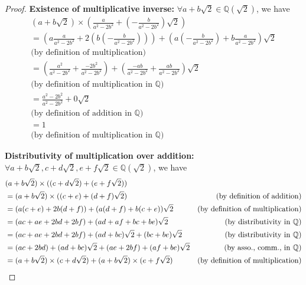 \documentclass[10pt]{article}
\newcommand{\Q}{\mathbb{Q}}
\newenvironment{problem}[2][Problem]{\begin{trivlist}
\item[\hskip \labelsep {\bfseries #1}\hskip \labelsep {\bfseries #2.}]}{\end{trivlist}}
\begin{document}
\begin{problem}{4}
\begin{enumerate}
\begin{proof}
                \textbf{Existence of multiplicative inverse:} \( \forall a + b\sqrt{2} \in \Q(\sqrt{2}) \), we have
                \begin{align*}
                    &(a + b\sqrt{2}) \times \left(\frac{a}{a^2 - 2b^2} + \left(- \frac{b}{a^2 - 2b^2}\right)\sqrt{2}\right) & \\
                    &= \left(a \frac{a}{a^2 - 2b^2} + 2\left(b \left(-\frac{b}{a^2 - 2b^2}\right)\right)\right) + \left(a \left(-\frac{b}{a^2 - 2b^2}\right) + b \frac{a}{a^2 - 2b^2}\right)\sqrt{2} \\
                    & \text{(by definition of multiplication)} & \\
                    &= \left(\frac{a^2}{a^2 - 2b^2} + \frac{-2b^2}{a^2 - 2b^2}\right) + \left(\frac{-ab}{a^2 - 2b^2} + \frac{ab}{a^2 - 2b^2}\right)\sqrt{2} & \\ 
                    & \text{(by definition of multiplication in $\Q$)} & \\
                    &= \frac{a^2 - 2b^2}{a^2 - 2b^2} + 0\sqrt{2} \\
                    & \text{(by definition of addition in $\Q$)} & \\
                    &= 1 \\
                    & \text{(by definition of multiplication in $\Q$)} &
                \end{align*}


                \textbf{Distributivity of multiplication over addition:} \( \forall a + b\sqrt{2}, c + d\sqrt{2}, e + f\sqrt{2} \in \Q(\sqrt{2}) \), we have
                \begin{align*}
                    & (a + b\sqrt{2}) \times ((c + d\sqrt{2}) + (e + f\sqrt{2})) \\
                    &= (a + b\sqrt{2}) \times ((c + e) + (d + f)\sqrt{2}) & \text{(by definition of addition)} \hfill \\
                                                                             &= (a(c + e) + 2b(d + f)) + (a(d + f) + b(c + e))\sqrt{2} & \text{(by definition of multiplication)} \hfill \\
                                                                             &= (ac + ae + 2bd + 2bf) + (ad + af + bc + be)\sqrt{2} & \text{(by distributivity in $\Q$)} \hfill \\
                                                                             &= (ac + ae + 2bd + 2bf) + (ad +bc)\sqrt{2} + (bc + be)\sqrt{2} & \text{(by distributivity in $\Q$)} \hfill \\
                                                                             &= (ac + 2bd) + (ad + bc)\sqrt{2} + (ae + 2bf) + (af + be)\sqrt{2} & \text{(by asso., comm., in $\Q$)}\hfill \\
                                                                             &= (a + b\sqrt{2}) \times (c + d\sqrt{2}) + (a + b\sqrt{2}) \times (e + f\sqrt{2}) & \text{(by definition of multiplication)} \hfill
                \end{align*}


\end{proof}
\end{enumerate}
\end{problem}
\end{document}
